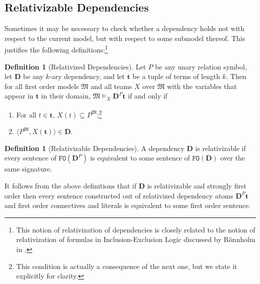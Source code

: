 \documentclass{article}
\theoremstyle{definition}
\newtheorem{Definition}[Theorem]{Definition}
\newcommand{\tuple}{\mathbf}
\newcommand{\FO}{\texttt{FO}}
\newcommand{\M}{\mathfrak M}
\newcommand{\D}{\mathbf D}
\begin{document}
\subsection{Relativizable Dependencies}
\label{sec:relativizable}
Sometimes it may be necessary to check whether a dependency holds not with respect to the current model, but with respect to some submodel thereof. This justifies the following definitions:\footnote{This notion of relativization of dependencies is closely related to the notion of relativization of formulas in Inclusion-Exclusion Logic discussed by R\"onnholm in \cite{ronnholm2018arity}.}	
\begin{Definition}[Relativized Dependencies]
	Let $P$ be any unary relation symbol, let $\D$ be any $k$-ary dependency, and let $\tuple t$ be a tuple of terms of length $k$. Then for all first order models $\M$ and all teams $X$ over $\M$ with the variables that appear in $\tuple t$ in their domain, $\M \models_X \D^P \tuple t$ if and only if 
	\begin{enumerate}
		\item For all $t \in \tuple t$, $X(t) \subseteq P^\M$;\footnote{This condition is actually a consequence of the next one, but we state it explicitly for clarity.} 
		\item $\langle P^\M, X(\tuple t)\rangle \in \D$. 
	\end{enumerate}
\end{Definition}
\begin{Definition}[Relativizable Dependencies]
	A dependency $\D$ is relativizable if every sentence of $\FO(\D^P)$ is equivalent to some sentence of $\FO(\D)$ over the same signature. 
\end{Definition}

It follows from the above definitions that if $\D$ is relativizable and strongly first order then every sentence constructed out of relativized dependency atoms $\D^P \tuple t$ and first order connectives and literals is equivalent to some first order sentence.
\end{document}

